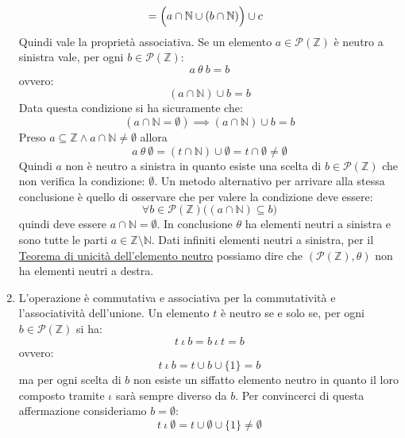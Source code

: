 \begin{enumerate}
\begin{align*}
		&= \Bigl( a \cap \mathbb{N} \cup (b \cap \mathbb{N})  \Bigr) \cup c
	\end{align*}
	Quindi vale la proprietà associativa. Se un elemento $a \in \mathcal{P}(\mathbb{Z})$ è neutro a sinistra vale, per ogni $b \in \mathcal{P}(\mathbb{Z})$:
	\begin{displaymath}
		a \ \theta \ b = b
	\end{displaymath}
	ovvero:
	\begin{displaymath}
		(a \cap \mathbb{N}) \cup b = b
	\end{displaymath}
	Data questa condizione si ha sicuramente che:
	\begin{displaymath}
		(a \cap \mathbb{N} = \emptyset) \implies  (a \cap \mathbb{N}) \cup b = b
	\end{displaymath}
	Preso $a \subseteq \mathbb{Z} \wedge a \cap \mathbb{N} \neq \emptyset$ allora $$a \ \theta \ \emptyset = (t \cap \mathbb{N}) \cup \emptyset = t \cap \emptyset \neq \emptyset $$
	Quindi $a$ non è neutro a sinistra in quanto esiste una scelta di $b \in \mathcal{P}(\mathbb{Z})$ che non verifica la condizione: $\emptyset$. Un metodo alternativo per arrivare alla stessa conclusione è quello di osservare che per valere la condizione deve essere:
	\begin{displaymath}
		\forall b \in \mathcal{P}(\mathbb{Z})	\bigl( (a \cap \mathbb{N}) \subseteq b \bigr)
	\end{displaymath}
	quindi deve essere $a \cap \mathbb{N} = \emptyset$. In conclusione $\theta$ ha elementi neutri a sinistra e sono tutte le parti $a \in \mathbb{Z} \setminus \mathbb{N}$. Dati infiniti elementi neutri a sinistra, per il \hyperlink{thm:neutro}{Teorema di unicità dell'elemento neutro} possiamo dire che $(\mathcal{P}(\mathbb{Z}), \theta)$ non ha elementi neutri a destra.
	\item L'operazione è commutativa e associativa per la commutatività e l'associatività dell'unione. Un elemento $t$ è neutro se e solo se, per ogni $b \in \mathcal{P}(\mathbb{Z})$ si ha:
	\begin{displaymath}
		t \ \iota \ b = b \ \iota \ t  = b
	\end{displaymath}
	ovvero:
	\begin{displaymath}
		t \ \iota \ b = t \cup b \cup \{1\} = b
	\end{displaymath}
	ma per ogni scelta di $b$ non esiste un siffatto elemento neutro in quanto il loro composto tramite $\iota$ sarà sempre diverso da $b$. Per convincerci di questa affermazione consideriamo $b= \emptyset$:
	\begin{displaymath}
		t \ \iota \ \emptyset = t \cup \emptyset \cup \{1\} \neq \emptyset
	\end{displaymath}
\end{enumerate}
